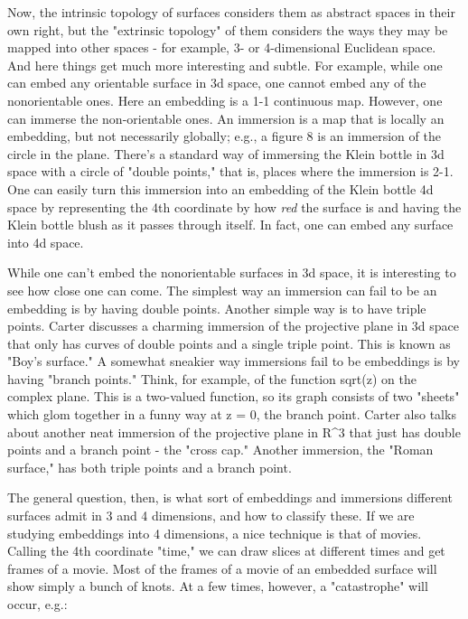 Now, the intrinsic topology of surfaces considers them as abstract
spaces in their own right, but the "extrinsic topology" of them
considers the ways they may be mapped into other spaces - for example,
3- or 4-dimensional Euclidean space.  And here things get much more
interesting and subtle.  For example, while one can embed any orientable
surface in 3d space, one cannot embed any of the nonorientable ones.
Here an embedding is a 1-1 continuous map.  However, one can immerse
the non-orientable ones.  An immersion is a map that is locally an
embedding, but not necessarily globally; e.g., a figure 8 is an
immersion of the circle in the plane.  There's a standard way of
immersing the Klein bottle in 3d space with a circle of "double points,"
that is, places where the immersion is 2-1.  One can easily turn this
immersion into an embedding of the Klein bottle 4d space by representing
the 4th coordinate by how \emph{red} the surface is and having the Klein
bottle blush as it passes through itself.  In fact, one can embed any
surface into 4d space.

While one can't embed the nonorientable surfaces in 3d space, it is
interesting to see how close one can come.  The simplest way an
immersion can fail to be an embedding is by having double points.  
Another simple way is to have triple points.  Carter discusses a
charming immersion of the projective plane in 3d space that only has
curves of double points and a single triple point.  This is known as
"Boy's surface."  A somewhat sneakier way immersions fail to be
embeddings is by having "branch points."  Think, for example, of the
function sqrt(z) on the complex plane.  This is a two-valued function,
so its graph consists of two "sheets" which glom together in a funny
way at z = 0, the branch point.  Carter also talks about another neat
immersion of the projective plane in R^3 that just has double points and
a branch point - the "cross cap."  Another immersion, the "Roman
surface," has both triple points and a branch point.  

The general question, then, is what sort of embeddings and immersions
different surfaces admit in 3 and 4 dimensions, and how to classify
these.  If we are studying embeddings into 4 dimensions, a nice
technique is that of movies.  Calling the 4th coordinate "time," we can
draw slices at different times and get frames of a movie.  Most of the
frames of a movie of an embedded surface will show simply a bunch of
knots.  At a few times, however, a "catastrophe" will occur, e.g.:

